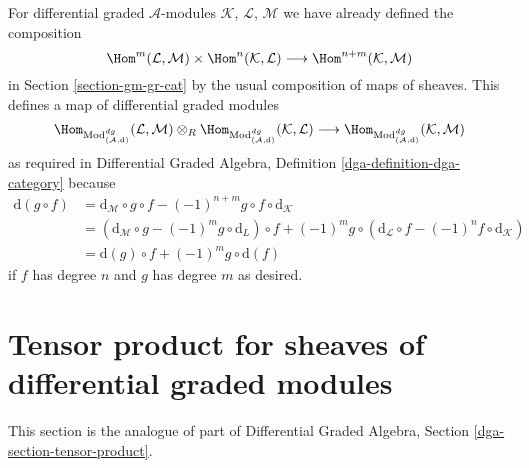 \medskip\noindent
For differential graded $\mathcal{A}$-modules
$\mathcal{K}$, $\mathcal{L}$, $\mathcal{M}$
we have already defined the composition
$$
\Hom^m(\mathcal{L}, \mathcal{M}) \times
\Hom^n(\mathcal{K}, \mathcal{L}) \longrightarrow
\Hom^{n + m}(\mathcal{K}, \mathcal{M})
$$
in Section \ref{section-gm-gr-cat} by the usual composition
of maps of sheaves. This defines a map of differential graded modules
$$
\Hom_{\text{Mod}^{dg}_{(\mathcal{A}, \text{d})}}(\mathcal{L}, \mathcal{M})
\otimes_R
\Hom_{\text{Mod}^{dg}_{(\mathcal{A}, \text{d})}}(\mathcal{K}, \mathcal{L})
\longrightarrow
\Hom_{\text{Mod}^{dg}_{(\mathcal{A}, \text{d})}}(\mathcal{K}, \mathcal{M})
$$
as required in
Differential Graded Algebra, Definition \ref{dga-definition-dga-category}
because
\begin{align*}
\text{d}(g \circ f) & =
\text{d}_\mathcal{M} \circ g \circ f
- (-1)^{n + m} g \circ f \circ \text{d}_\mathcal{K} \\
& =
\left(\text{d}_\mathcal{M} \circ g - (-1)^m g \circ \text{d}_L\right) \circ f
+ (-1)^m g \circ \left(\text{d}_\mathcal{L} \circ f
- (-1)^n f \circ \text{d}_\mathcal{K}\right) \\
& =
\text{d}(g) \circ f + (-1)^m g \circ \text{d}(f)
\end{align*}
if $f$ has degree $n$ and $g$ has degree $m$ as desired.






\section{Tensor product for sheaves of differential graded modules}
\label{section-tensor-product-dg}

\noindent
This section is the analogue of part of
Differential Graded Algebra, Section \ref{dga-section-tensor-product}.

